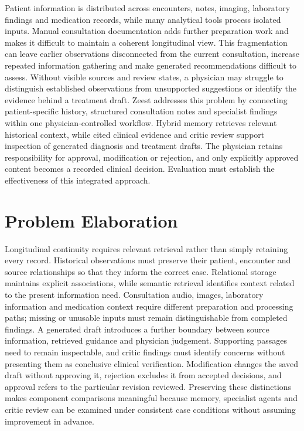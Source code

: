 Patient information is distributed across encounters, notes, imaging, laboratory findings and medication records, while many analytical tools process isolated inputs. Manual consultation documentation adds further preparation work and makes it difficult to maintain a coherent longitudinal view. This fragmentation can leave earlier observations disconnected from the current consultation, increase repeated information gathering and make generated recommendations difficult to assess. Without visible sources and review states, a physician may struggle to distinguish established observations from unsupported suggestions or identify the evidence behind a treatment draft. Zeest addresses this problem by connecting patient-specific history, structured consultation notes and specialist findings within one physician-controlled workflow. Hybrid memory retrieves relevant historical context, while cited clinical evidence and critic review support inspection of generated diagnosis and treatment drafts. The physician retains responsibility for approval, modification or rejection, and only explicitly approved content becomes a recorded clinical decision. Evaluation must establish the effectiveness of this integrated approach.

\section{Problem Elaboration}

Longitudinal continuity requires relevant retrieval rather than simply retaining every record. Historical observations must preserve their patient, encounter and source relationships so that they inform the correct case. Relational storage maintains explicit associations, while semantic retrieval identifies context related to the present information need. Consultation audio, images, laboratory information and medication context require different preparation and processing paths; missing or unusable inputs must remain distinguishable from completed findings. A generated draft introduces a further boundary between source information, retrieved guidance and physician judgement. Supporting passages need to remain inspectable, and critic findings must identify concerns without presenting them as conclusive clinical verification. Modification changes the saved draft without approving it, rejection excludes it from accepted decisions, and approval refers to the particular revision reviewed. Preserving these distinctions makes component comparisons meaningful because memory, specialist agents and critic review can be examined under consistent case conditions without assuming improvement in advance.

